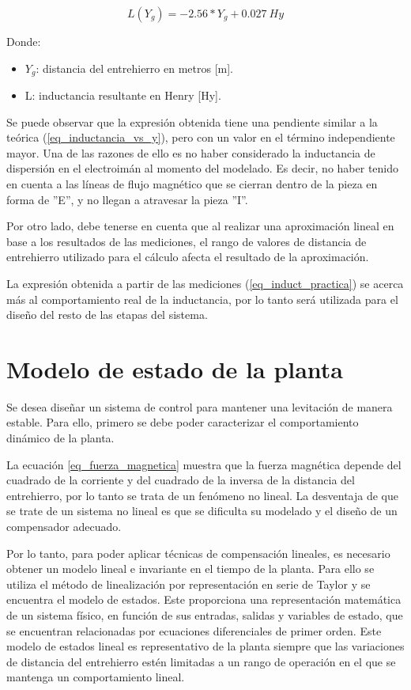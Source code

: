 \begin{equation}
	\label{eq_induct_practica}
	L(Y_g)=-2.56*Y_{g}+0.027\:Hy
\end{equation}

\noindent Donde:
\begin{itemize}
	\item $Y_{g}$: distancia del entrehierro en metros [m].
	\item L: inductancia resultante en Henry [Hy].
\end{itemize}

Se puede observar que la expresión obtenida tiene una pendiente similar a la teórica (\ref{eq_inductancia_vs_y}), pero con un valor en el término independiente mayor. Una de las razones de ello es no haber considerado la inductancia de dispersión en el electroimán al momento del modelado. Es decir, no haber tenido en cuenta a las líneas de flujo magnético que se cierran dentro de la pieza en forma de ”E”, y no llegan a atravesar la pieza ”I”. 

Por otro lado, debe tenerse en cuenta que al realizar una aproximación lineal en base a los resultados de las mediciones, el rango de valores de distancia de entrehierro utilizado para el cálculo afecta el resultado de la aproximación. 

La expresión obtenida a partir de las mediciones (\ref{eq_induct_practica}) se acerca más al comportamiento real de la inductancia, por lo tanto será utilizada para el diseño del resto de las etapas del sistema. 



\section{Modelo de estado de la planta}

Se desea diseñar un sistema de control para mantener una levitación de manera estable. Para ello, primero se debe poder caracterizar el comportamiento dinámico de la planta.

La ecuación \ref{eq_fuerza_magnetica} muestra que la fuerza magnética depende del cuadrado de la corriente y del cuadrado de la inversa de la distancia del entrehierro, por lo tanto se trata de un fenómeno no lineal. La desventaja de que se trate de un sistema no lineal es que se dificulta su modelado y el diseño de un compensador adecuado.

Por lo tanto, para poder aplicar técnicas de compensación lineales, es necesario obtener un modelo lineal e invariante en el tiempo de la planta. Para ello se utiliza el método de linealización por representación en serie de Taylor y se encuentra el modelo de estados. Este proporciona una representación matemática de un sistema físico, en función de sus entradas, salidas y variables de estado, que se encuentran relacionadas por ecuaciones diferenciales de primer orden. Este modelo de estados lineal es representativo de la planta siempre que las variaciones de distancia del entrehierro estén limitadas a un rango de operación en el que se mantenga un comportamiento lineal.

